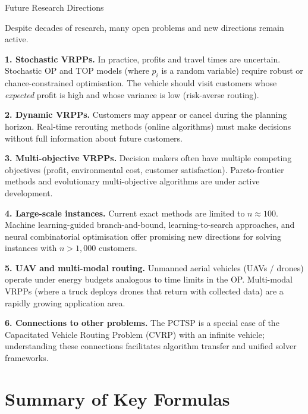 \documentclass[aspectratio=169,10pt]{beamer}
\begin{document}
\begin{frame}[allowframebreaks]{Future Research Directions}

  Despite decades of research, many open problems and new directions
  remain active.

  \medskip
  \textbf{1. Stochastic VRPPs.}
  In practice, profits and travel times are uncertain.
  Stochastic OP and TOP models (where $p_i$ is a random variable) require
  robust or chance-constrained optimisation.
  The vehicle should visit customers whose \emph{expected} profit is high
  and whose variance is low (risk-averse routing).

  \medskip
  \textbf{2. Dynamic VRPPs.}
  Customers may appear or cancel during the planning horizon.
  Real-time rerouting methods (online algorithms) must make decisions
  without full information about future customers.

  \medskip
  \textbf{3. Multi-objective VRPPs.}
  Decision makers often have multiple competing objectives (profit,
  environmental cost, customer satisfaction).
  Pareto-frontier methods and evolutionary multi-objective algorithms
  are under active development.

  \medskip
  \textbf{4. Large-scale instances.}
  Current exact methods are limited to $n \approx 100$.
  Machine learning-guided branch-and-bound, learning-to-search approaches,
  and neural combinatorial optimisation offer promising new directions
  for solving instances with $n > 1{,}000$ customers.

  \medskip
  \textbf{5. UAV and multi-modal routing.}
  Unmanned aerial vehicles (UAVs / drones) operate under energy budgets
  analogous to time limits in the OP.
  Multi-modal VRPPs (where a truck deploys drones that return with
  collected data) are a rapidly growing application area.

  \medskip
  \textbf{6. Connections to other problems.}
  The PCTSP is a special case of the Capacitated Vehicle Routing Problem
  (CVRP) with an infinite vehicle; understanding these connections
  facilitates algorithm transfer and unified solver frameworks.

\end{frame}

\section{Summary of Key Formulas}
\end{document}
